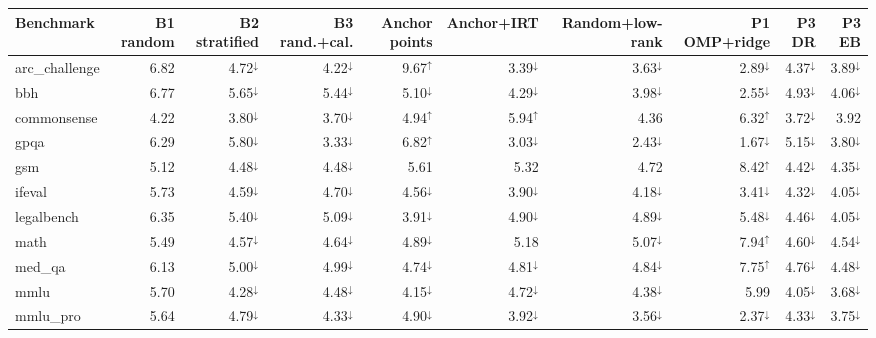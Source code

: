 {\scriptsize\setlength{\tabcolsep}{2.5pt}
\begin{tabular}{lrrrrrrrrr}
\toprule
Benchmark & B1 random & B2 stratified & B3 rand.+cal. & Anchor points & Anchor+IRT & Random+low-rank & P1 OMP+ridge & P3 DR & P3 EB \\
\midrule
arc\_challenge & 6.82 & 4.72$^{\downarrow}$ & 4.22$^{\downarrow}$ & 9.67$^{\uparrow}$ & 3.39$^{\downarrow}$ & 3.63$^{\downarrow}$ & 2.89$^{\downarrow}$ & 4.37$^{\downarrow}$ & 3.89$^{\downarrow}$ \\
bbh & 6.77 & 5.65$^{\downarrow}$ & 5.44$^{\downarrow}$ & 5.10$^{\downarrow}$ & 4.29$^{\downarrow}$ & 3.98$^{\downarrow}$ & 2.55$^{\downarrow}$ & 4.93$^{\downarrow}$ & 4.06$^{\downarrow}$ \\
commonsense & 4.22 & 3.80$^{\downarrow}$ & 3.70$^{\downarrow}$ & 4.94$^{\uparrow}$ & 5.94$^{\uparrow}$ & 4.36 & 6.32$^{\uparrow}$ & 3.72$^{\downarrow}$ & 3.92 \\
gpqa & 6.29 & 5.80$^{\downarrow}$ & 3.33$^{\downarrow}$ & 6.82$^{\uparrow}$ & 3.03$^{\downarrow}$ & 2.43$^{\downarrow}$ & 1.67$^{\downarrow}$ & 5.15$^{\downarrow}$ & 3.80$^{\downarrow}$ \\
gsm & 5.12 & 4.48$^{\downarrow}$ & 4.48$^{\downarrow}$ & 5.61 & 5.32 & 4.72 & 8.42$^{\uparrow}$ & 4.42$^{\downarrow}$ & 4.35$^{\downarrow}$ \\
ifeval & 5.73 & 4.59$^{\downarrow}$ & 4.70$^{\downarrow}$ & 4.56$^{\downarrow}$ & 3.90$^{\downarrow}$ & 4.18$^{\downarrow}$ & 3.41$^{\downarrow}$ & 4.32$^{\downarrow}$ & 4.05$^{\downarrow}$ \\
legalbench & 6.35 & 5.40$^{\downarrow}$ & 5.09$^{\downarrow}$ & 3.91$^{\downarrow}$ & 4.90$^{\downarrow}$ & 4.89$^{\downarrow}$ & 5.48$^{\downarrow}$ & 4.46$^{\downarrow}$ & 4.05$^{\downarrow}$ \\
math & 5.49 & 4.57$^{\downarrow}$ & 4.64$^{\downarrow}$ & 4.89$^{\downarrow}$ & 5.18 & 5.07$^{\downarrow}$ & 7.94$^{\uparrow}$ & 4.60$^{\downarrow}$ & 4.54$^{\downarrow}$ \\
med\_qa & 6.13 & 5.00$^{\downarrow}$ & 4.99$^{\downarrow}$ & 4.74$^{\downarrow}$ & 4.81$^{\downarrow}$ & 4.84$^{\downarrow}$ & 7.75$^{\uparrow}$ & 4.76$^{\downarrow}$ & 4.48$^{\downarrow}$ \\
mmlu & 5.70 & 4.28$^{\downarrow}$ & 4.48$^{\downarrow}$ & 4.15$^{\downarrow}$ & 4.72$^{\downarrow}$ & 4.38$^{\downarrow}$ & 5.99 & 4.05$^{\downarrow}$ & 3.68$^{\downarrow}$ \\
mmlu\_pro & 5.64 & 4.79$^{\downarrow}$ & 4.33$^{\downarrow}$ & 4.90$^{\downarrow}$ & 3.92$^{\downarrow}$ & 3.56$^{\downarrow}$ & 2.37$^{\downarrow}$ & 4.33$^{\downarrow}$ & 3.75$^{\downarrow}$ \\

\end{tabular}}
